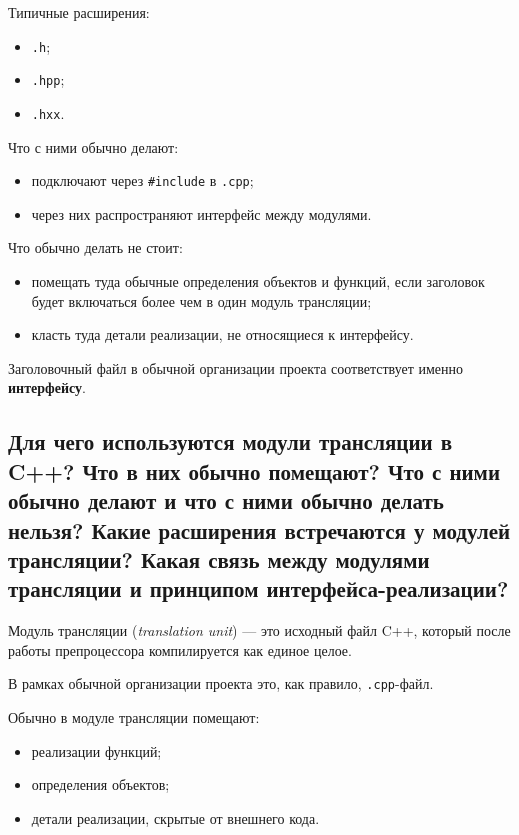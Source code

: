 Типичные расширения:
\begin{itemize}
    \item \texttt{.h};
    \item \texttt{.hpp};
    \item \texttt{.hxx}.
\end{itemize}

Что с ними обычно делают:
\begin{itemize}
    \item подключают через \texttt{\#include} в \texttt{.cpp};
    \item через них распространяют интерфейс между модулями.
\end{itemize}

Что обычно делать не стоит:
\begin{itemize}
    \item помещать туда обычные определения объектов и функций, если заголовок будет включаться более чем в один модуль трансляции;
    \item класть туда детали реализации, не относящиеся к интерфейсу.
\end{itemize}

\begin{remark}
Заголовочный файл в обычной организации проекта соответствует именно \textbf{интерфейсу}.
\end{remark}


\subsection{Для чего используются модули трансляции в C++? Что в них обычно помещают? Что с ними обычно делают и что с ними обычно делать нельзя? Какие расширения встречаются у модулей трансляции? Какая связь между модулями трансляции и принципом интерфейса-реализации?}

\begin{definition}
Модуль трансляции (\textit{translation unit}) --- это исходный файл C++, который после работы препроцессора компилируется как единое целое.
\end{definition}

В рамках обычной организации проекта это, как правило, \texttt{.cpp}-файл.

Обычно в модуле трансляции помещают:
\begin{itemize}
    \item реализации функций;
    \item определения объектов;
    \item детали реализации, скрытые от внешнего кода.
\end{itemize}

